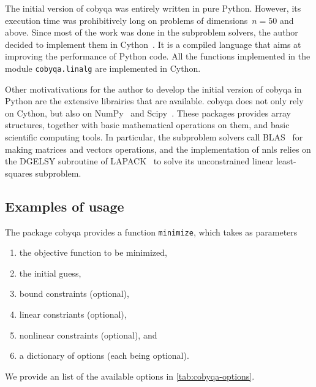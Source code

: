 The initial version of \gls{cobyqa} was entirely written in pure Python.
However, its execution time was prohibitively long on problems of dimensions~$n = 50$ and above.
Since most of the work was done in the subproblem solvers, the author decided to implement them in Cython~\cite{Behnel_Etal_2011}.
It is a compiled language that aims at improving the performance of Python code.
All the functions implemented in the module \texttt{cobyqa.linalg} are implemented in Cython.

Other motivativations for the author to develop the initial version of \gls{cobyqa} in Python are the extensive librairies that are available.
\Gls{cobyqa} does not only rely on Cython, but also on NumPy~\cite{Harris_Etal_2020} and Scipy~\cite{Virtanen_Etal_2020}.
These packages provides array structures, together with basic mathematical operations on them, and basic scientific computing tools.
In particular, the subproblem solvers call BLAS~\cite{Blackford_Etal_2002} for making matrices and vectors operations, and the implementation of \gls{nnls} relies on the DGELSY subroutine of LAPACK~\cite{Anderson_Etal_1999} to solve its unconstrained linear least-squares subproblem.

\subsection{Examples of usage}

The package \gls{cobyqa} provides a function \texttt{minimize}, which takes as parameters
\begin{enumerate}
    \item the objective function to be minimized,
    \item the initial guess,
    \item bound constraints (optional),
    \item linear constriants (optional),
    \item nonlinear constraints (optional), and
    \item a dictionary of options (each being optional).
\end{enumerate}

We provide an list of the available options in \cref{tab:cobyqa-options}.

